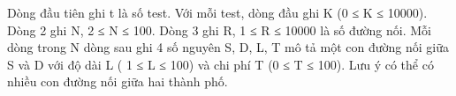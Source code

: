 Dòng đầu tiên ghi t là số test. Với mỗi test, dòng đầu ghi K (0 ≤ K ≤ 10000). Dòng 2 ghi N, 2 ≤ N ≤ 100. Dòng 3 ghi R, 1 ≤ R ≤ 10000 là số đường nối. Mỗi dòng trong N dòng sau ghi 4 số nguyên S, D, L, T mô tả một con đường nối giữa S và D với độ dài L ( 1 ≤ L ≤ 100) và chi phí T (0 ≤ T ≤ 100). Lưu ý có thể có nhiều con đường nối giữa hai thành phố.